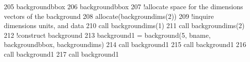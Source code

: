 \begin{DoxyCode}
205     backgroundbbox%
206     backgroundbbox%
207     \textcolor{comment}{!allocate space for the dimensions vectors of the background}
208     \textcolor{keyword}{allocate}(backgroundims(2))
209     \textcolor{comment}{!inquire dimensions units, and data}
210     \textcolor{keyword}{call }backgroundims(1)%
211     \textcolor{keyword}{call }backgroundims(2)%
212     \textcolor{comment}{!construct background}
213     background1 = background(5, bname, backgroundbbox, backgroundims)
214     \textcolor{keyword}{call }background1%
215     \textcolor{keyword}{call }background1%
216     \textcolor{keyword}{call }background1%
217     \textcolor{keyword}{call }background1%
\end{DoxyCode}
